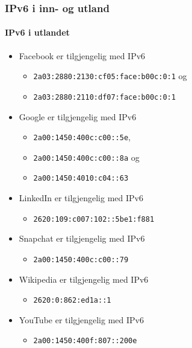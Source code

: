 \begin{frame}
  \frametitle{IPv6 i inn- og utland}
  \framesubtitle{IPv6 i utlandet}
  \begin{multicols}{2}
    \begin{itemize}
    \item Facebook er tilgjengelig med IPv6
      \begin{itemize}
      \item \texttt{\scriptsize2a03:2880:2130:cf05:\alert<2>{face}:\alert<2>{b00c}:0:1} og
      \item \texttt{\scriptsize2a03:2880:2110:df07:\alert<2>{face}:\alert<2>{b00c}:0:1}
      \end{itemize}
    \item Google er tilgjengelig med IPv6
      \begin{itemize}
      \item \texttt{2a00:1450:400c:c00::5e},
      \item \texttt{2a00:1450:400c:c00::8a} og
      \item \texttt{2a00:1450:4010:c04::63}
      \end{itemize}
      \columnbreak
    \item LinkedIn er tilgjengelig med IPv6
      \begin{itemize}
      \item \texttt{2620:109:c007:102::5be1:f881}
      \end{itemize}
    \item Snapchat er tilgjengelig med IPv6
      \begin{itemize}
      \item \texttt{2a00:1450:400c:c00::79}
      \end{itemize}
    \item Wikipedia er tilgjengelig med IPv6
      \begin{itemize}
      \item \texttt{2620:0:862:\alert<2>{ed1a}::1}
      \end{itemize}
    \item YouTube er tilgjengelig med IPv6
      \begin{itemize}
      \item \texttt{2a00:1450:400f:807::200e}
      \end{itemize}
    \end{itemize}
  \end{multicols}
\end{frame}

